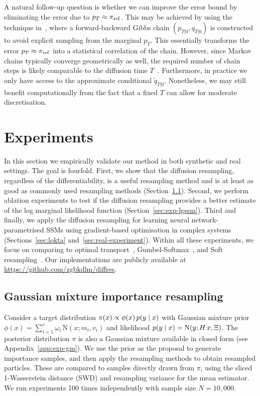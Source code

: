 \documentclass{article}
\begin{document}
A natural follow-up question is whether we can improve the error bound by eliminating the error due to $p_T \approx \pi_{\mathrm{ref}}$. 
This may be achieved by using the technique in~\citet{Corenflos2024FBS, Zhao2024rsta}, where a forward-backward Gibbs chain $(p_{T | 0}, q_{T|0})$ is constructed to avoid explicit sampling from the marginal $p_T$. 
This essentially transforms the error $p_T \approx \pi_{\mathrm{ref}}$ into a statistical correlation of the chain. 
However, since Markov chains typically converge geometrically as well, the required number of chain steps is likely comparable to the diffusion time $T$~\citep{Meyn2009, Andrieu2024}. Furthermore, in practice we only have access to the approximate conditional $\widetilde{q}_{T|0}$. 
Nonetheless, we may still benefit computationally from the fact that a fixed $T$ can allow for moderate discretisation. 

\section{Experiments}
\label{sec:experiments}
In this section we empirically validate our method in both synthetic and real settings. 
The goal is fourfold. 
First, we show that the diffusion resampling, regardless of the differentiability, is a useful resampling method and is at least as good as commonly used resampling methods (Section~\ref{sec:gm-importance-resampling}). 
Second, we perform ablation experiments to test if the diffusion resampling provides a better estimate of the log marginal likelihood function (Section~\ref{sec:exp-lgssm}). 
Third and finally, we apply the diffusion resampling for learning neural network-parametrised SSMs using gradient-based optimisation in complex systems (Sections~\ref{sec:lokta} and~\ref{sec:real-experiment}).
Within all these experiments, we focus on comparing to optimal transport~\citep[OT,][]{Corenflos2021}, Gumbel-Softmax~\citep{Jang2017categorical}, and Soft resampling~\citep{Karkus2018}. 
Our implementations are publicly available at \url{https://github.com/zgbkdlm/diffres}.

\subsection{Gaussian mixture importance resampling}
\label{sec:gm-importance-resampling}
Consider a target distribution $\pi(x) \propto \phi(x) \, p(y {\;|\;} x)$ with Gaussian mixture prior $\phi(x) = \sum_{i=1}^c \omega_i \, \mathrm{N}(x; m_i, v_i)$ and likelihood $p(y {\;|\;} x) = \mathrm{N}(y; H \, x, \Xi)$. 
The posterior distribution $\pi$ is also a Gaussian mixture available in closed form (see Appendix~\ref{app:exp-gm}).
We use the prior as the proposal to generate importance samples, and then apply the resampling methods to obtain resampled particles.
These are compared to samples directly drawn from $\pi$, using the sliced 1-Wasserstein distance (SWD) and resampling variance for the mean estimator. 
We run experiments 100 times independently with sample size $N=10,000$.
\end{document}
